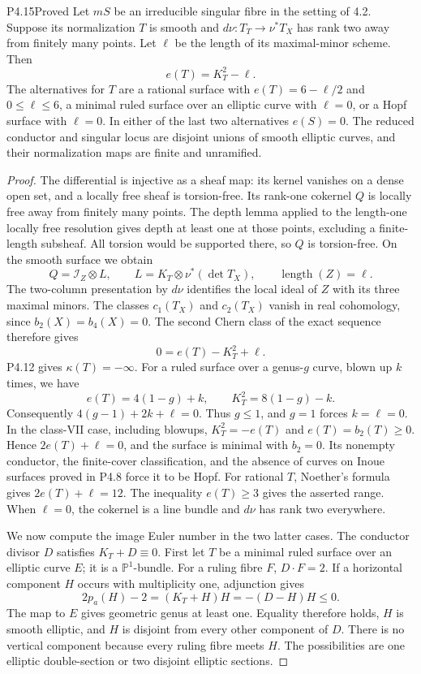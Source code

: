 \begin{statement}{P4.15}{Proved}
Let $mS$ be an irreducible singular fibre in the setting of 4.2.
Suppose its normalization $T$ is smooth and $d\nu:T_T\to\nu^*T_X$
has rank two away from finitely many points. Let $\ell$ be the
length of its maximal-minor scheme. Then
\[
 e(T)=K_T^2-\ell.
\]
The alternatives for $T$ are a rational surface with
$e(T)=6-\ell/2$ and $0\leq\ell\leq6$, a minimal ruled surface
over an elliptic curve with $\ell=0$, or a Hopf surface with
$\ell=0$. In either of the last two alternatives $e(S)=0$.
The reduced conductor and singular locus are disjoint unions of
smooth elliptic curves, and their normalization maps are finite
and unramified.
\end{statement}
\begin{proof}
The differential is injective as a sheaf map: its kernel vanishes
on a dense open set, and a locally free sheaf is torsion-free.
Its rank-one cokernel $Q$ is locally free away from finitely many
points. The depth lemma applied to the length-one locally free
resolution gives depth at least one at those points, excluding
a finite-length subsheaf. All torsion would be supported there,
so $Q$ is torsion-free. On the smooth surface we obtain
\[
 Q=\mathcal I_Z\otimes L,\qquad
 L=K_T\otimes\nu^*(\det T_X),\qquad \operatorname{length}(Z)=\ell.
\]
The two-column presentation by $d\nu$ identifies the local ideal
of $Z$ with its three maximal minors. The classes $c_1(T_X)$ and
$c_2(T_X)$ vanish in real cohomology, since $b_2(X)=b_4(X)=0$.
The second Chern class of the exact sequence therefore gives
\[
 0=e(T)-K_T^2+\ell.
\]
P4.12 gives $\kappa(T)=-\infty$. For a ruled surface over a
genus-$g$ curve, blown up $k$ times, we have
\[
 e(T)=4(1-g)+k,\qquad K_T^2=8(1-g)-k.
\]
Consequently $4(g-1)+2k+\ell=0$. Thus $g\leq1$, and $g=1$
forces $k=\ell=0$. In the class-VII case, including blowups,
$K_T^2=-e(T)$ and $e(T)=b_2(T)\geq0$. Hence
$2e(T)+\ell=0$, and the surface is minimal with $b_2=0$.
Its nonempty conductor, the finite-cover classification, and the
absence of curves on Inoue surfaces proved in P4.8 force it to
be Hopf. For rational $T$, Noether's formula gives
$2e(T)+\ell=12$. The inequality $e(T)\geq3$ gives the asserted
range. When $\ell=0$, the cokernel is a line bundle and $d\nu$
has rank two everywhere.

We now compute the image Euler number in the two latter cases.
The conductor divisor $D$ satisfies $K_T+D\equiv0$. First let
$T$ be a minimal ruled surface over an elliptic curve $E$;
it is a $\mathbb P^1$-bundle. For a ruling fibre $F$, $D\cdot F=2$.
If a horizontal component $H$ occurs with multiplicity one,
adjunction gives
\[
 2p_a(H)-2=(K_T+H)H=-(D-H)H\leq0.
\]
The map to $E$ gives geometric genus at least one. Equality
therefore holds, $H$ is smooth elliptic, and $H$ is disjoint
from every other component of $D$. There is no vertical
component because every ruling fibre meets $H$. The possibilities
are one elliptic double-section or two disjoint elliptic sections.


\end{proof}
